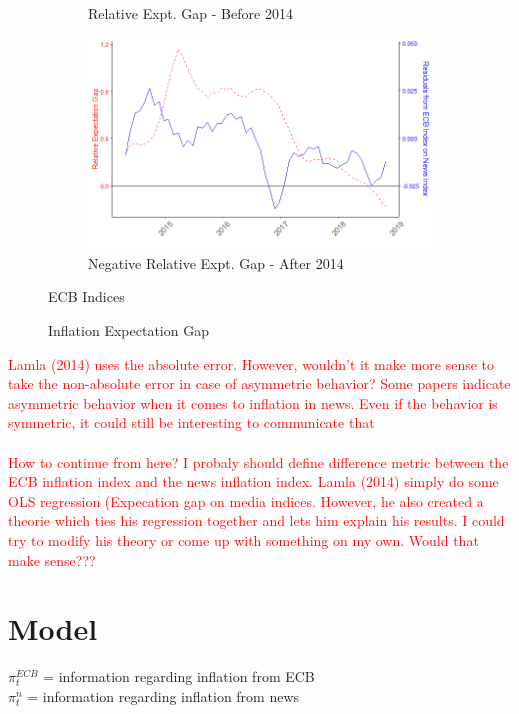 \documentclass[review]{elsarticle}
\begin{document}
\begin{figure}[h!]
\begin{subfigure}{6cm}
    \caption{Relative Expt. Gap - Before 2014}
    \label{ECB_inf}
\end{subfigure}
\hfil
\begin{subfigure}{6cm}
    \includegraphics{rel_exp_res_aft2014.png}
    \caption{Negative Relative Expt. Gap - After 2014}
    \label{ECB_inf}
\end{subfigure}
\caption{ECB Indices}
\caption{Inflation Expectation Gap}
\label{fig:Expectation Gap}
    \end{figure}


\textcolor{red}{Lamla (2014) uses the absolute error. However, wouldn't it make more sense to take the non-absolute error in case of asymmetric behavior? Some papers indicate asymmetric behavior when it comes to inflation in news. Even if the behavior is symmetric, it could still be interesting to communicate that}
\\
\\
\textcolor{red}{How to continue from here? I probaly should define difference metric between the ECB inflation index and the news inflation index. Lamla (2014) simply do some OLS regression (Expecation gap on media indices. However, he also created a theorie which ties his regression together and lets him explain his results. I could try to modify his theory or come up with something on my own. Would that make sense???}

\section{Model}\label{sec:Model}

$\pi^{ECB}_t$ = information regarding inflation from ECB \\
$\pi^n_t$ = information regarding inflation from news \\
\end{document}
